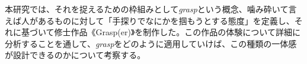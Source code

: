 本研究では、それを捉えるための枠組みとして\textit{grasp}という概念、噛み砕いて言えば人があるものに対して「手探りでなにかを掴もうとする態度」を定義し、それに基づいて修士作品《Grasp(er)》を制作した。この作品の体験について詳細に分析することを通して、\textit{grasp}をどのように適用していけば、この種類の一体感が設計できるのかについて考察する。





